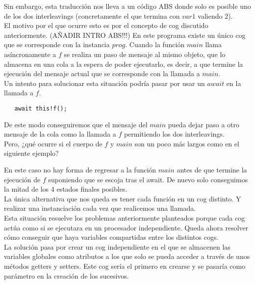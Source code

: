 

Sin embargo, esta traducción nos lleva a un código ABS donde solo es posible uno de los dos interleavings (concretamente el que termina con $var1$ valiendo $2$).\\

El motivo por el que ocurre esto es por el concepto de cog discutido anteriormente. (AÑADIR INTRO ABS!!!) En este programa existe un único cog que se corresponde con la instancia $prog$. Cuando la función $main$ llama asíncronamente a $f$ se realiza un paso de mensaje al mismo objeto, que lo almacena en una cola a la espera de poder ejecutarlo, es decir, a que termine la ejecución del mensaje actual que se corresponde con la llamada a $main$.\\

Un intento para solucionar esta situación podría pasar por usar un $await$ en la llamada a $f$.

\begin{lstlisting}
   await this!f();
\end{lstlisting}

De este modo conseguiremos que el mensaje del $main$ pueda dejar paso a otro mensaje de la cola como la llamada a $f$ permitiendo los dos interleavings.\\

Pero, ¿qué ocurre si el cuerpo de $f$ y $main$ son un poco más largos como en el siguiente ejemplo?



En este caso no hay forma de regresar a la función $main$ antes de que termine la ejecución de $f$ suponiendo que se escoja tras el await. De nuevo solo conseguimos la mitad de los 4 estados finales posibles.\\

La única alternativa que nos queda es tener cada función en un cog distinto. Y realizar una instanciación cada vez que realicemos una llamada.\\

Esta situación resuelve los problemas anteriormente planteados porque cada cog actúa como si se ejecutara en un procesador independiente. Queda ahora resolver cómo conseguir que haya variables compartidas entre los distintos cogs.\\

La solución pasa por crear un cog independiente en el que se almacenen las variables globales como atributos a los que solo se pueda acceder a través de unos métodos getters y setters. Este cog sería el primero en crearse y se pasaría como parámetro en la creación de los sucesivos.\\

